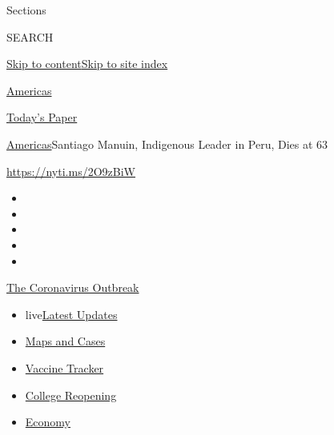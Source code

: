 Sections

SEARCH

\protect\hyperlink{site-content}{Skip to
content}\protect\hyperlink{site-index}{Skip to site index}

\href{https://www.nytimes.com/section/world/americas}{Americas}

\href{https://myaccount.nytimes.com/auth/login?response_type=cookie\&client_id=vi}{}

\href{https://www.nytimes.com/section/todayspaper}{Today's Paper}

\href{/section/world/americas}{Americas}\textbar{}Santiago Manuin,
Indigenous Leader in Peru, Dies at 63

\url{https://nyti.ms/2O9zBiW}

\begin{itemize}
\item
\item
\item
\item
\item
\end{itemize}

\href{https://www.nytimes.com/news-event/coronavirus?action=click\&pgtype=Article\&state=default\&region=TOP_BANNER\&context=storylines_menu}{The
Coronavirus Outbreak}

\begin{itemize}
\tightlist
\item
  live\href{https://www.nytimes.com/2020/08/03/world/coronavirus-covid-19.html?action=click\&pgtype=Article\&state=default\&region=TOP_BANNER\&context=storylines_menu}{Latest
  Updates}
\item
  \href{https://www.nytimes.com/interactive/2020/us/coronavirus-us-cases.html?action=click\&pgtype=Article\&state=default\&region=TOP_BANNER\&context=storylines_menu}{Maps
  and Cases}
\item
  \href{https://www.nytimes.com/interactive/2020/science/coronavirus-vaccine-tracker.html?action=click\&pgtype=Article\&state=default\&region=TOP_BANNER\&context=storylines_menu}{Vaccine
  Tracker}
\item
  \href{https://www.nytimes.com/2020/08/02/us/covid-college-reopening.html?action=click\&pgtype=Article\&state=default\&region=TOP_BANNER\&context=storylines_menu}{College
  Reopening}
\item
  \href{https://www.nytimes.com/live/2020/08/03/business/stock-market-today-coronavirus?action=click\&pgtype=Article\&state=default\&region=TOP_BANNER\&context=storylines_menu}{Economy}
\end{itemize}

